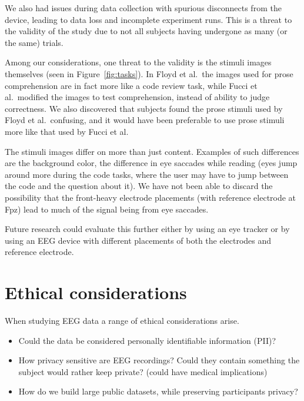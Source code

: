     We also had issues during data collection with spurious disconnects from the device, leading to data loss and incomplete experiment runs. This is a threat to the validity of the study due to not all subjects having undergone as many (or the same) trials.

    Among our considerations, one threat to the validity is the stimuli images themselves (seen in Figure~\ref{fig:tasks}). In Floyd et al.~the images used for prose comprehension are in fact more like a code review task, while Fucci et al.~modified the images to test comprehension, instead of ability to judge correctness. We also discovered that subjects found the prose stimuli used by Floyd et al.~confusing, and it would have been preferable to use prose stimuli more like that used by Fucci et al.

    The stimuli images differ on more than just content. Examples of such differences are the background color, the difference in eye saccades while reading (eyes jump around more during the code tasks, where the user may have to jump between the code and the question about it). We have not been able to discard the possibility that the front-heavy electrode placements (with reference electrode at Fpz) lead to much of the signal being from eye saccades. 

    Future research could evaluate this further either by using an eye tracker or by using an EEG device with different placements of both the electrodes and reference electrode.


\section{Ethical considerations}

    When studying EEG data a range of ethical considerations arise. 

    \begin{itemize}
        \item Could the data be considered personally identifiable information (PII)? 
        \item How privacy sensitive are EEG recordings? Could they contain something the subject would rather keep private? (could have medical implications)
        \item How do we build large public datasets, while preserving participants privacy?
    \end{itemize}

